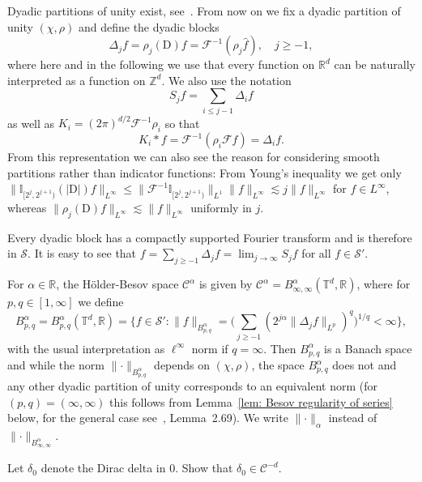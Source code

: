 \documentclass[a4paper,11pt]{article}
\newcommand{\cdummy}{\cdot}
\newcommand{\mathD}{\mathrm{D}}
\newcommand{\CF}{\mathscr{F}}
\newcommand{\CS}{\mathscr{S}}
\newcommand{\CC}{\mathscr{C}}
\begin{document}
Dyadic partitions of unity exist, see~{\cite{Bahouri2011}}. From now on
we fix a dyadic partition of unity $(\chi, \rho)$ and define the dyadic blocks
\[ \Delta_j f = \rho_j (\mathD) f = \CF^{- 1} (\rho_j \hat{f}), \hspace{1em}
   j \geqslant - 1, \]
where here and in the following we use that every function on $\mathbb{R}^d$ can be naturally interpreted as a function on $\mathbb{Z}^d$. We also use the notation
\[ S_j f = \sum_{i \leqslant j - 1} \Delta_i f \]
as well as $K_i = (2 \pi)^{d / 2} \CF^{- 1} \rho_i$ so that
\[ K_i \ast f = \CF^{- 1} ( \rho_i \CF f ) = \Delta_i f. \]
From this representation we can also see the reason for considering smooth partitions rather than indicator functions: From Young's inequality we get only $\| \mathbb{I}_{[2^j, 2^{j + 1})} (| \mathD |) f \|_{L^{\infty}} \le \| \CF^{-1}\mathbb{I}_{[2^j, 2^{j + 1})}\|_{L^1} \| f \|_{L^{\infty}} \lesssim j \| f \|_{L^{\infty}}$ for $f \in L^\infty$, whereas $\| \rho_j (\mathD)
f \|_{L^{\infty}} \lesssim \| f \|_{L^{\infty}}$ uniformly in $j$.

Every dyadic block has a compactly supported Fourier transform and is
therefore in $\CS$. It is easy to see that $f = \sum_{j \geqslant - 1}
\Delta_j f = \lim_{j \rightarrow \infty} S_j f$ for all $f \in \CS'$.

For $\alpha \in \mathbb{R}$, the H{\"o}lder-Besov space $\CC^{\alpha}$ is
given by $\CC^{\alpha} = B^{\alpha}_{\infty, \infty} (\mathbb{T}^d,
\mathbb{R})$, where for $p, q \in [1, \infty]$ we define
\[
    B^{\alpha}_{p, q} = B^{\alpha}_{p, q} (\mathbb{T}^d, \mathbb{R}) = \Big\{ f \in \CS' : \|f\|_{B^{\alpha}_{p, q}} = \Big( \sum_{j \geqslant - 1} (2^{j \alpha} \| \Delta_j f\|_{L^p})^q \Big)^{1 / q} < \infty \Big\},
\]
with the usual interpretation as $\ell^{\infty}$ norm if $q = \infty$. Then
$B^{\alpha}_{p, q}$ is a Banach space and while the norm $\lVert \cdummy
\rVert_{B^{\alpha}_{p, q}}$ depends on $(\chi, \rho)$, the space
$B^{\alpha}_{p, q}$ does not and any other dyadic partition of unity
corresponds to an equivalent norm (for $(p,q) = (\infty, \infty)$ this follows from Lemma~\ref{lem: Besov
regularity of series} below, for the general case see~\cite{Bahouri2011}, Lemma~2.69). We write $\lVert \cdummy \rVert_{\alpha}$
instead of $\lVert \cdummy \rVert_{B^{\alpha}_{\infty, \infty}}$.

\begin{exercise}
  Let $\delta_0$ denote the Dirac delta in 0. Show that $\delta_0 \in \CC^{-d}$.
\end{exercise}
\end{document}
